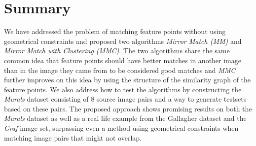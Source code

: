 \documentclass[12pt,journal]{IEEEtran}
\begin{document}
\section{Summary}
We have addressed the problem of matching feature points without using 
geometrical constraints and proposed two algorithms \emph{Mirror Match 
(MM)} and \emph{Mirror Match with Clustering (MMC)}. The two algorithms 
share the same common idea that feature points should have better 
matches in another image than in the image they came from to be 
considered good matches and \emph{MMC} further improves on this idea by 
using the structure of the similarity graph of the feature points. We 
also address how to test the algorithms by constructing the 
\emph{Murals} dataset consisting of $8$ source image pairs and a way to 
generate testsets based on these pairs.  The proposed approach shows 
promising results on both the \emph{Murals} dataset as well as a real 
life example from the Gallagher dataset and the \emph{Graf} image set, 
surpassing even a method using geometrical constraints when matching 
image pairs that might not overlap.
%


\end{document}
